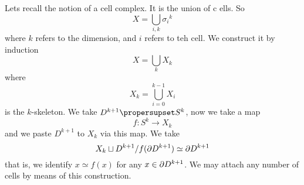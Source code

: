 Lets recall the notion of a cell complex. It is the union of c
ells. So
\begin{equation}
X=\bigcup_{i,k}{\sigma_{i}}^{k}
\end{equation}
where $k$ refers to the dimension, and $i$ refers to teh cell. We
construct it by induction
\begin{equation}
X=\bigcup_{k}X_{k}
\end{equation}
where
\begin{equation}
X_{k}=\bigcup_{i=0}^{k-1}X_{i}
\end{equation}
is the $k$-skeleton. We take $D^{k+1}\propersupset S^k$, now we
take a map
\begin{equation}
f\colon S^k\to X_k
\end{equation}
and we paste $D^{k+1}$ to $X_{k}$ via this map. We take
\begin{equation}
X_{k}\sqcup D^{k+1}/f(\partial D^{k+1})\simeq \partial D^{k+1}
\end{equation}
that is, we identify $x\simeq f(x)$ for any $x\in\partial
D^{k+1}$. We may attach any number of cells by means of this
construction. 

